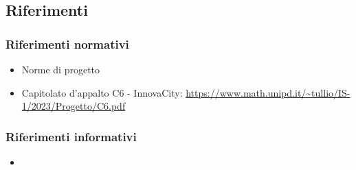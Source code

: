 \subsection{Riferimenti}
\subsubsection{Riferimenti normativi}
\begin{itemize}
    \item Norme di progetto
    \item Capitolato d’appalto C6 - InnovaCity: \url{https://www.math.unipd.it/~tullio/IS-1/2023/Progetto/C6.pdf}
\end{itemize}
\subsubsection{Riferimenti informativi}
\begin{itemize}
    \item 
\end{itemize}

